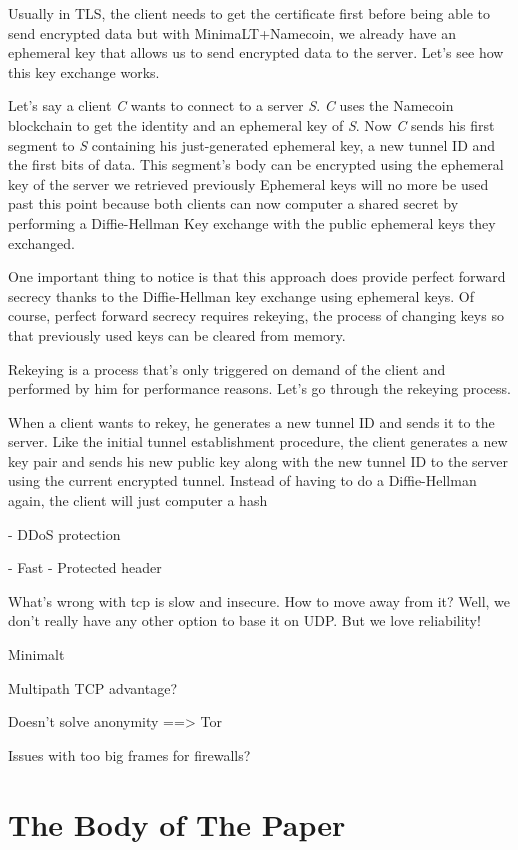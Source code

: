 \documentclass{vldb}
\begin{document}
Usually in TLS, the client needs to get the certificate first before being able to send encrypted data but with MinimaLT+Namecoin, we already have an ephemeral key that allows us to send encrypted data to the server. Let's see how this key exchange works.

Let's say a client \emph{C} wants to connect to a server \emph{S}. \emph{C} uses the Namecoin blockchain to get the identity and an ephemeral key of \emph{S}. Now \emph{C} sends his first segment to \emph{S} containing his just-generated ephemeral key, a new tunnel ID and the first bits of data. This segment's body can be encrypted using the ephemeral key of the server we retrieved previously Ephemeral keys will no more be used past this point because both clients can now computer a shared secret by performing a Diffie-Hellman Key exchange with the public ephemeral keys they exchanged. 

One important thing to notice is that this approach does provide perfect forward secrecy thanks to the Diffie-Hellman key exchange using ephemeral keys. Of course, perfect forward secrecy requires rekeying, the process of changing keys so that previously used keys can be cleared from memory.

Rekeying is a process that's only triggered on demand of the client and performed by him for performance reasons. Let's go through the rekeying process. 

When a client wants to rekey, he generates a new tunnel ID and sends it to the server. Like the initial tunnel establishment procedure, the client generates a new key pair and sends his new public key along with the new tunnel ID to the server using the current encrypted tunnel. Instead of having to do a Diffie-Hellman again, the client will just computer a hash    

- DDoS protection


- Fast
- Protected header

What's wrong with tcp is slow and insecure. How to move away from it? Well, we don't really have any other option to base it on UDP.
But we love reliability!

Minimalt  

Multipath TCP advantage?

Doesn't solve anonymity ==> Tor

Issues with too big frames for firewalls?
\section{The {\secit Body} of The Paper}
\end{document}

